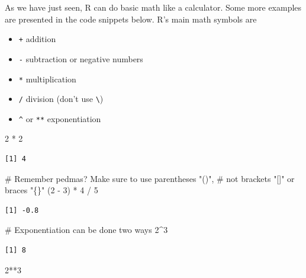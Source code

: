 \documentclass[
  letterpaper,
  DIV=11,
  numbers=noendperiod]{scrreprt}
\newenvironment{Shaded}{\begin{snugshade}}{\end{snugshade}}
\newcommand{\CommentTok}[1]{\textcolor[rgb]{0.37,0.37,0.37}{#1}}
\newcommand{\DecValTok}[1]{\textcolor[rgb]{0.68,0.00,0.00}{#1}}
\newcommand{\NormalTok}[1]{\textcolor[rgb]{0.00,0.23,0.31}{#1}}
\newcommand{\SpecialCharTok}[1]{\textcolor[rgb]{0.37,0.37,0.37}{#1}}
\providecommand{\tightlist}{%
  \setlength{\itemsep}{0pt}\setlength{\parskip}{0pt}}\usepackage{longtable,booktabs,array}
\begin{document}
As we have just seen, R can do basic math like a calculator. Some more
examples are presented in the code snippets below. R's main math symbols
are

\begin{itemize}
\tightlist
\item
  \texttt{+} addition
\item
  \texttt{-} subtraction or negative numbers
\item
  \texttt{*} multiplication
\item
  \texttt{/} division (don't use \texttt{\textbackslash{}})
\item
  \texttt{\^{}} or \texttt{**} exponentiation
\end{itemize}

\begin{Shaded}
\begin{Highlighting}[]
\DecValTok{2} \SpecialCharTok{*} \DecValTok{2}
\end{Highlighting}
\end{Shaded}

\begin{verbatim}
[1] 4
\end{verbatim}

\begin{Shaded}
\begin{Highlighting}[]
\CommentTok{\# Remember pedmas? Make sure to use parentheses "()", }
\CommentTok{\# not brackets "[]" or braces "\{\}"}
\NormalTok{(}\DecValTok{2} \SpecialCharTok{{-}} \DecValTok{3}\NormalTok{) }\SpecialCharTok{*} \DecValTok{4} \SpecialCharTok{/} \DecValTok{5} 
\end{Highlighting}
\end{Shaded}

\begin{verbatim}
[1] -0.8
\end{verbatim}

\begin{Shaded}
\begin{Highlighting}[]
\CommentTok{\# Exponentiation can be done two ways}
\DecValTok{2}\SpecialCharTok{\^{}}\DecValTok{3}
\end{Highlighting}
\end{Shaded}

\begin{verbatim}
[1] 8
\end{verbatim}

\begin{Shaded}
\begin{Highlighting}[]
\DecValTok{2}\SpecialCharTok{**}\DecValTok{3}
\end{Highlighting}
\end{Shaded}
\end{document}

